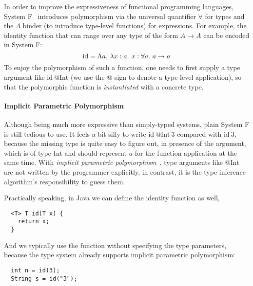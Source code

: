 In order to improve the expressiveness of functional programming languages,
System F~\citep{reynolds1983types} introduces polymorphism
via the universal quantifier $\forall$ for types
and the $\Lambda$ binder (to introduce type-level functions) for expressions.
For example, the identity function that can range over any type of the form $A \to A$
can be encoded in System F:
$$\text{id} = \Lambda a.~\lam[x:a]x : \all a \to a$$
To enjoy the polymorphism of such a function,
one needs to first supply a type argument like $\text{id}~@\text{Int}$
(we use the $@$ sign to denote a type-level application),
so that the polymorphic function is \emph{instantiated} with
a concrete type.

\paragraph{Implicit Parametric Polymorphism}

Although being much more expressive than simply-typed systems,
plain System F is still tedious to use.
It feels a bit silly to write $\text{id}~@\text{Int}~3$ compared with $\text{id}~3$,
because the missing type is quite easy to figure out,
in presence of the argument, which is of type $\text{Int}$ and
should represent $a$ for the function application at the same time.
With \emph{implicit parametric polymorphism}~\citep{reynolds1983types},
type arguments like $@\text{Int}$ are not written by the programmer explicitly,
in contrast, it is the type inference algorithm's responsibility to guess them.

Practically speaking, in Java we can define the identity function as well,
\begin{verbatim}
  <T> T id(T x) {
    return x;
  }
\end{verbatim}
And we typically use the function without specifying the type parameters,
because the type system already supports implicit parametric polymorphism:
\begin{verbatim}
  int n = id(3);
  String s = id("3");
\end{verbatim}

